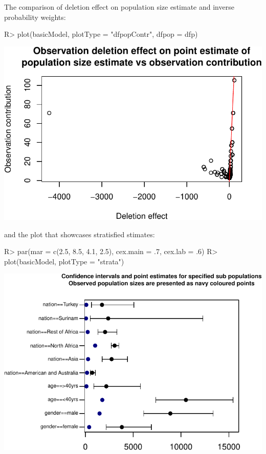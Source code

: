 \documentclass[
]{jss}
\newcommand{\1}{\mathcal{I}} \newcommand{\bx}{\boldsymbol{x}}
\begin{document}
The comparison of deletion effect on population size estimate and
inverse probability weights:

\begin{CodeChunk}
\begin{CodeInput}
R> plot(basicModel, plotType = "dfpopContr", dfpop = dfp)
\end{CodeInput}


\begin{center}\includegraphics{singleRcapture_files/figure-latex/dfpopsize_plot-1} \end{center}

\end{CodeChunk}

and the plot that showcases stratisfied stimates:

\begin{CodeChunk}
\begin{CodeInput}
R> par(mar = c(2.5, 8.5, 4.1, 2.5), cex.main = .7, cex.lab = .6)
R> plot(basicModel, plotType = "strata")
\end{CodeInput}


\begin{center}\includegraphics{singleRcapture_files/figure-latex/strata_plot-1} \end{center}

\end{CodeChunk}
\end{document}
